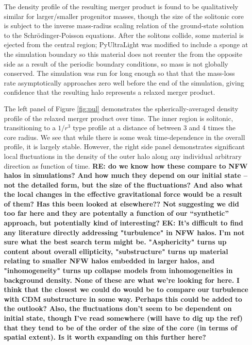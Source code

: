 \documentclass[a4paper,11pt]{article}
\newcommand{\ek}[1]{{{\bf \color{red} EK: #1}}}
\newcommand{\re}[1]{{{\bf \color{green} RE: #1}}}
\begin{document}
The density profile of the resulting merger product is found to be qualitatively similar for larger/smaller progenitor masses, though the size of the solitonic core is subject to the inverse mass-radius scaling relation of the ground-state solution to the Schr{\"o}dinger-Poisson equations. After the solitons collide, some material is ejected from the central region; {\sc PyUltraLight} was modified to include a sponge at the simulation boundary so this material does not  reenter the from the opposite side as a result of the periodic boundary conditions, so mass is not globally conserved. The simulation was run for long enough so that that the mass-loss rate asymptotically approaches zero well before the end of the simulation, giving confidence that the resulting halo represents a relaxed merger product. 

The left panel of Figure \ref{fig:pul} demonstrates the spherically-averaged density profile of the relaxed merger product over time. The inner region is solitonic, transitioning to a $1/r^3$ type profile at a distance of between 3 and 4 times the core radius. We see that while there is some weak time-dependence in the overall profile, it is largely stable. However, the right side panel demonstrates significant local fluctuations in the density of the outer halo along any individual arbitrary direction as function of time.  \re{do we know how these compare to NFW halos in simulations? And how much they depend on our initial state -- not the detailed form, but the size of the fluctuations?  And also what the local changes in the effective gravitational force would be a result of them? Has this been looked at elsewhere?? Not suggesting we did too far here and they are potentally a function of our ``synthetic'' approach, but potentially kind of interesting?}\ek{It's difficult to find any literature directly addressing "turbulence" in NFW halos. I'm not sure what the best search  term might be. "Asphericity" turns up content about overall ellipticity, "substructure" turns up material relating to smaller NFW halos embedded in larger halos, and "inhomogeneity" turns up collapse models from inhomogeneities in background density. None of these are what we're looking for here. I think that the closest we could do would be to compare our turbulence with CDM substructure in some way. Perhaps this could be added to the outlook? Also, the fluctuations don't seem to be dependent on initial state, though I've read somewhere (will have to dig up the ref) that they tend to be of the order of the size of the core (in terms of spatial extent). Is it worth expanding on this further here?}
\end{document}

